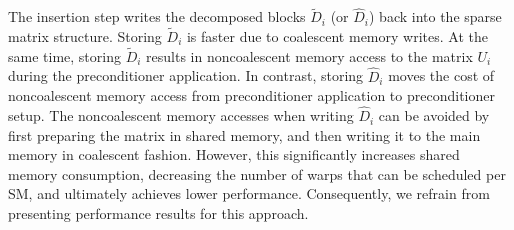 The insertion step writes the decomposed blocks $\widetilde{D}_i$ (or $\hat{D}_i$)
back into the sparse matrix structure.
Storing $\widetilde{D}_i$ is faster due to coalescent memory writes.
At the same time, storing $\widetilde{D}_i$ results in noncoalescent memory access
to the matrix $U_i$ during the preconditioner application.
In contrast, storing $\hat{D}_i$ moves the cost of noncoalescent memory access
from preconditioner application to preconditioner setup.
The noncoalescent memory accesses when writing $\hat{D}_i$
can be avoided by first preparing the matrix in shared memory, and then writing it to
the main memory in coalescent fashion.
However, this significantly increases shared memory consumption,
decreasing the
number of warps that can be scheduled per SM, and ultimately achieves lower performance.
Consequently, we refrain from presenting performance results for this approach.

